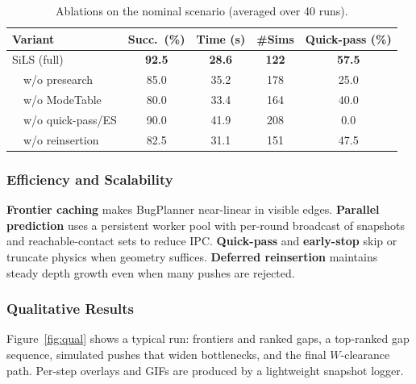 \begin{table}[t]
  \centering
  \caption{Ablations on the nominal scenario (averaged over 40 runs).}
  \label{tab:ablation}
  \vspace{2pt}

  {%
  \setlength{\tabcolsep}{3pt}
  \renewcommand{\arraystretch}{0.9}

  \begin{tabular}{lcccc}
  \toprule
  Variant & Succ.~(\%) & Time (s) & \#Sims & Quick-pass (\%) \\
  \midrule
  SiLS (full)            & \textbf{92.5} & \textbf{28.6} & \textbf{122} & \textbf{57.5} \\
  \ \ w/o presearch      & 85.0          & 35.2          & 178          & 25.0          \\
  \ \ w/o ModeTable      & 80.0          & 33.4          & 164          & 40.0          \\
  \ \ w/o quick-pass/ES  & 90.0          & 41.9          & 208          & 0.0           \\
  \ \ w/o reinsertion    & 82.5          & 31.1          & 151          & 47.5          \\
  \bottomrule
  \end{tabular}
  }%

  \vspace{3pt}
  \small
\end{table}
  


\subsubsection{Efficiency and Scalability}
\label{subsec:eff}
\textbf{Frontier caching} makes BugPlanner near-linear in visible edges.
\textbf{Parallel prediction} uses a persistent worker pool with per-round
broadcast of snapshots and reachable-contact sets to reduce IPC.
\textbf{Quick-pass} and \textbf{early-stop} skip or truncate physics when
geometry suffices. \textbf{Deferred reinsertion} maintains steady depth
growth even when many pushes are rejected.

\subsubsection{Qualitative Results}
\label{subsec:qual}
Figure~\ref{fig:qual} shows a typical run: frontiers and ranked gaps,
a top-ranked gap sequence, simulated pushes that widen bottlenecks, and
the final $W$-clearance path. Per-step overlays and GIFs are produced by
a lightweight snapshot logger.


